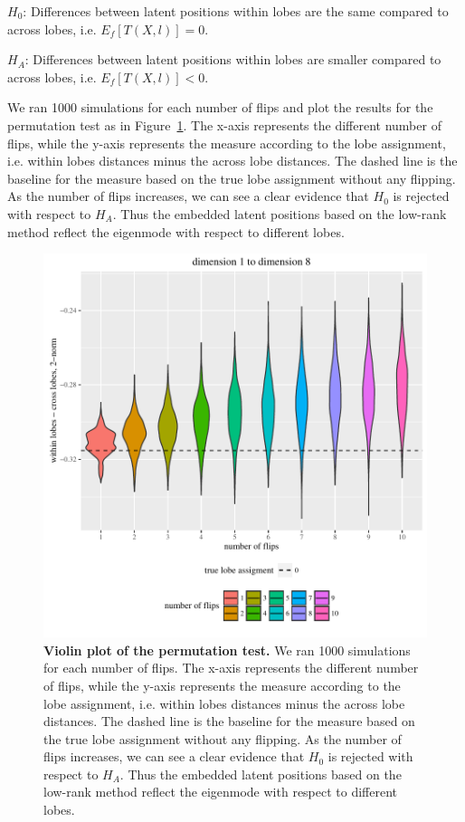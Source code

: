 \documentclass[simplex.tex]{subfiles}
\begin{document}
$H_0$: Differences between latent positions within lobes are the same compared to across lobes, i.e. $E_f[T(X, l)] = 0$.

$H_A$: Differences between latent positions within lobes are smaller compared to across lobes, i.e. $E_f[T(X, l)] < 0$.

We ran 1000 simulations for each number of flips and plot the results for the permutation test as in Figure~\ref{fig:violin}. The x-axis represents the different number of flips, while the y-axis represents the measure according to the lobe assignment, i.e. within lobes distances minus the across lobe distances. The dashed line is the baseline for the measure based on the true lobe assignment without any flipping. As the number of flips increases, we can see a clear evidence that $H_0$ is rejected with respect to $H_A$. Thus the embedded latent positions based on the low-rank method reflect the eigenmode with respect to different lobes.

\begin{figure}	
\centering
\includegraphics[height=.8\linewidth]{../../figs/violinplot_new_flip_2norm_1_8.pdf}
\caption{\textbf{Violin plot of the permutation test.} We ran 1000 simulations for each number of flips. The x-axis represents the different number of flips, while the y-axis represents the measure according to the lobe assignment, i.e. within lobes distances minus the across lobe distances. The dashed line is the baseline for the measure based on the true lobe assignment without any flipping. As the number of flips increases, we can see a clear evidence that $H_0$ is rejected with respect to $H_A$. Thus the embedded latent positions based on the low-rank method reflect the eigenmode with respect to different lobes.}
\label{fig:violin}
\end{figure}

%
\clearpage
\end{document}
